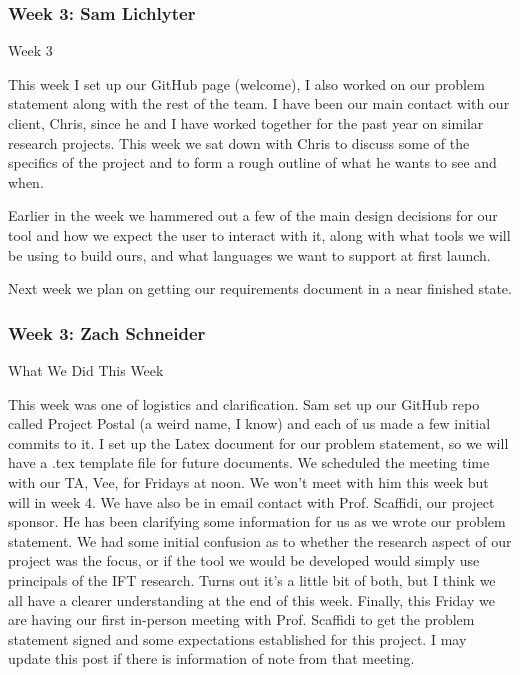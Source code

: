  \subsubsection{Week 3: Sam Lichlyter}

Week 3



This week I set up our GitHub page (welcome), I also worked on our problem statement along with the rest of the team. I have been our main contact with our client, Chris, since he and I have worked together for the past year on similar research projects. This week we sat down with Chris to discuss some of the specifics of the project and to form a rough outline of what he wants to see and when.



Earlier in the week we hammered out a few of the main design decisions for our tool and how we expect the user to interact with it, along with what tools we will be using to build ours, and what languages we want to support at first launch.



Next week we plan on getting our requirements document in a near finished state. \\ 

 \subsubsection{Week 3: Zach Schneider}

What We Did This Week

This week was one of logistics and clarification. Sam set up our GitHub repo called Project Postal (a weird name, I know) and each of us made a few initial commits to it. I set up the Latex document for our problem statement, so we will have a .tex template file for future documents. We scheduled the meeting time with our TA, Vee, for Fridays at noon. We won't meet with him this week but will in week 4. We have also be in email contact with Prof. Scaffidi, our project sponsor. He has been clarifying some information for us as we wrote our problem statement. We had some initial confusion as to whether the research aspect of our project was the focus, or if the tool we would be developed would simply use principals of the IFT research. Turns out it's a little bit of both, but I think we all have a clearer understanding at the end of this week. Finally, this Friday we are having our first in-person meeting with Prof. Scaffidi to get the problem statement signed and some expectations established for this project. I may update this post if there is information of note from that meeting.



